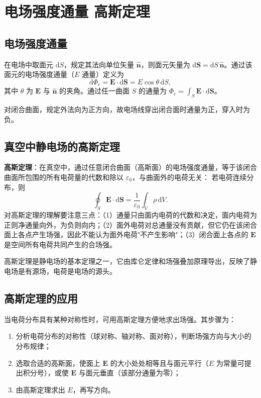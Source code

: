 
\section{电场强度通量 高斯定理}
    \subsection{电场强度通量}
    在电场中取面元 $\mathrm{d}S$，规定其法向单位矢量 $\hat{\boldsymbol{n}}$，则面元矢量为 $\mathrm{d}\boldsymbol{S}=\mathrm{d}S\,\hat{\boldsymbol{n}}$。通过该面元的电场强度通量（$E$ 通量）定义为
    \[
    \mathrm{d}\Phi_e=\boldsymbol{E}\cdot\mathrm{d}\boldsymbol{S}=E\cos\theta\,\mathrm{d}S,
    \]
    其中 $\theta$ 为 $\boldsymbol{E}$ 与 $\hat{\boldsymbol{n}}$ 的夹角。通过任一曲面 $S$ 的通量为 $\Phi_e=\int_S\boldsymbol{E}\cdot\mathrm{d}\boldsymbol{S}$。

    对闭合曲面，规定外法向为正方向，故电场线穿出闭合面时通量为正，穿入时为负。

    \subsection{真空中静电场的高斯定理}
    \textbf{高斯定理}：在真空中，通过任意闭合曲面（高斯面）的电场强度通量，等于该闭合曲面所包围的所有电荷量的代数和除以 $\varepsilon_0$，与曲面外的电荷无关：
    若电荷连续分布，则
    \[
    \oint_S\boldsymbol{E}\cdot\mathrm{d}\boldsymbol{S}=\frac{1}{\varepsilon_0}\int_V\rho\,\mathrm{d}V.
    \]
    对高斯定理的理解要注意三点：（1）通量只由面内电荷的代数和决定，面内电荷为正则净通量向外，为负则向内；（2）面外电荷对总通量没有贡献，但它仍在该闭合面上各点产生场强，因此不能认为面外电荷"不产生影响"；（3）闭合面上各点的 $\boldsymbol{E}$ 是空间所有电荷共同产生的合场强。

    高斯定理是静电场的基本定理之一，它由库仑定律和场强叠加原理导出，反映了静电场是有源场，电荷是电场的源头。

    \subsection{高斯定理的应用}
    当电荷分布具有某种对称性时，可用高斯定理方便地求出场强。其步骤为：
    \begin{enumerate}
        \item 分析电荷分布的对称性（球对称、轴对称、面对称），判断场强方向与大小的分布规律；
        \item 选取合适的高斯面，使面上 $\boldsymbol{E}$ 的大小处处相等且与面元平行（$E$ 为常量可提出积分号），或使 $\boldsymbol{E}$ 与面元垂直（该部分通量为零）；
        \item 由高斯定理求出 $E$，再写方向。
    \end{enumerate}


